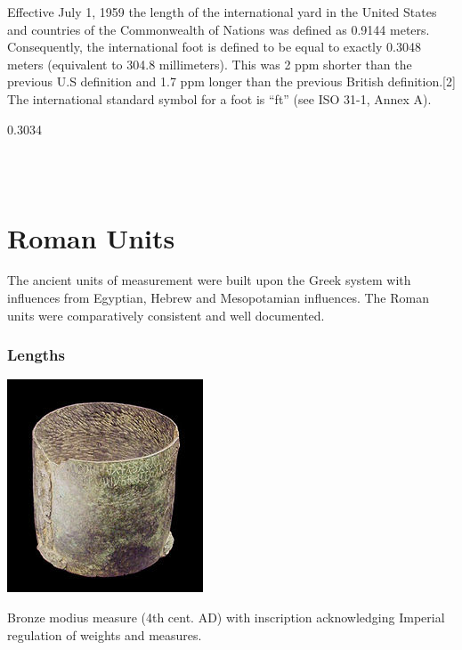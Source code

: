 \documentclass{tufte-book}
\makeatletter
\gdef\SetConversion#1#2#3{%
\expandafter\gdef\csname#1#2\endcsname{#3}%
\gdef\Temp{#3}%
\FPdiv\invert{1}{\Temp}%
\expandafter\gdef\csname#2#1\endcsname{\invert}%
}
\gdef\inUnitsValue{}
\gdef\outUnitsValue{}
\newif\if@debug
\def\test#1#2{
\if@debug{
  \convert{1}{#1}{#2}\\
   inUnitsValue=\inUnitsValue\\
   outUnitsValue=\outUnitsValue \\
   \convert{1}{#2}{#1}\\
   inUnitsValue=\inUnitsValue\\
   outUnitsValue=\outUnitsValue \\
  }
\fi}
\makeatother
\begin{document}
Effective July 1, 1959 the length of the international yard in the United States and countries of the Commonwealth of Nations was defined as 0.9144 meters. Consequently, the international foot is defined to be equal to exactly 0.3048 meters (equivalent to 304.8 millimeters). This was 2 ppm shorter than the previous U.S  definition and 1.7 ppm longer than the previous British definition.[2]
The international standard symbol for a foot is ``ft'' (see ISO 31-1, Annex A).

\SetConversion{ft}{m}{0.3034}

\\
\\

\test{ft}{m}


\chapter{Roman Units}
The ancient units of measurement were built upon the Greek system with influences from Egyptian, Hebrew and Mesopotamian influences. The Roman units were
comparatively consistent and well documented.

\subsection{Lengths}

\begin{marginfigure}
\includegraphics[width=\linewidth]{./graphics/modius}
\caption{Bronze modius measure (4th cent. AD) with inscription acknowledging Imperial regulation of weights and measures.}
\end{marginfigure}
\end{document}
